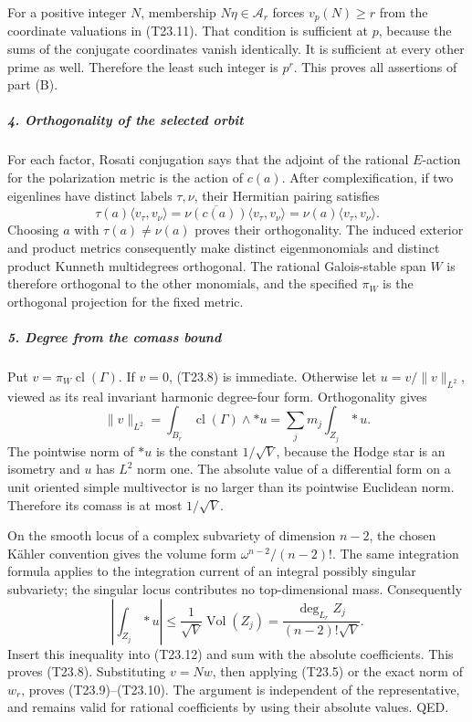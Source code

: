 For a positive integer \(N\), membership \(N\eta\in\mathcal A_r\) forces \(v_p(N)\ge r\) from the coordinate valuations in (T23.11). That condition is sufficient at \(p\), because the sums of the conjugate coordinates vanish identically. It is sufficient at every other prime as well. Therefore the least such integer is \(p^r\). This proves all assertions of part (B).

\subparagraph{4. Orthogonality of the selected orbit}\label{orthogonality-of-the-selected-orbit}

For each factor, Rosati conjugation says that the adjoint of the rational \(E\)-action for the polarization metric is the action of \(c(a)\). After complexification, if two eigenlines have distinct labels \(\tau,\nu\), their Hermitian pairing satisfies \[
 \tau(a)\langle v_\tau,v_\nu\rangle
  =\overline{\nu(c(a))}\langle v_\tau,v_\nu\rangle
  =\nu(a)\langle v_\tau,v_\nu\rangle .
\] Choosing \(a\) with \(\tau(a)\ne\nu(a)\) proves their orthogonality. The induced exterior and product metrics consequently make distinct eigenmonomials and distinct product Kunneth multidegrees orthogonal. The rational Galois-stable span \(W\) is therefore orthogonal to the other monomials, and the specified \(\pi_W\) is the orthogonal projection for the fixed metric.

\subparagraph{5. Degree from the comass bound}\label{degree-from-the-comass-bound}

Put \(v=\pi_W\operatorname{cl}(\Gamma)\). If \(v=0\), (T23.8) is immediate. Otherwise let \(u=v/\|v\|_{L^2}\), viewed as its real invariant harmonic degree-four form. Orthogonality gives \[
 \|v\|_{L^2}
  =\int_{B_r}\operatorname{cl}(\Gamma)\wedge *u
  =\sum_j m_j\int_{Z_j}*u.
 \tag{T23.12}
\] The pointwise norm of \(*u\) is the constant \(1/\sqrt V\), because the Hodge star is an isometry and \(u\) has \(L^2\) norm one. The absolute value of a differential form on a unit oriented simple multivector is no larger than its pointwise Euclidean norm. Therefore its comass is at most \(1/\sqrt V\).

On the smooth locus of a complex subvariety of dimension \(n-2\), the chosen Kähler convention gives the volume form \(\omega^{n-2}/(n-2)!\). The same integration formula applies to the integration current of an integral possibly singular subvariety; the singular locus contributes no top-dimensional mass. Consequently \[
 \left|\int_{Z_j}*u\right|
 \le \frac{1}{\sqrt V}\operatorname{Vol}(Z_j)
 =\frac{\deg_{L_r}Z_j}{(n-2)!\sqrt V}.
\] Insert this inequality into (T23.12) and sum with the absolute coefficients. This proves (T23.8). Substituting \(v=Nw\), then applying (T23.5) or the exact norm of \(w_r\), proves (T23.9)--(T23.10). The argument is independent of the representative, and remains valid for rational coefficients by using their absolute values. QED.

